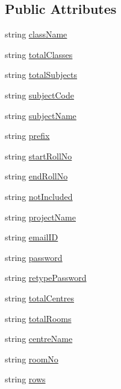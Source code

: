 \subsection*{Public Attributes}
\begin{DoxyCompactItemize}
\item 
string \hyperlink{classInputFieldName_ad8b28ebeabdabb5967542e317f549280}{class\-Name}
\item 
string \hyperlink{classInputFieldName_a5bf413dee6dcf29c1872e93f150d48c0}{total\-Classes}
\item 
string \hyperlink{classInputFieldName_ac58130077f39d82aaf447b1a67e9f70f}{total\-Subjects}
\item 
string \hyperlink{classInputFieldName_af1cc6871c33344c365e6e25ea482bd48}{subject\-Code}
\item 
string \hyperlink{classInputFieldName_a0614731b959afef6bb00f9fc957e7521}{subject\-Name}
\item 
string \hyperlink{classInputFieldName_a161d155f8faca2c5dea1bbd607b17553}{prefix}
\item 
string \hyperlink{classInputFieldName_a24baf5c915b4ee0fb8678e03adec043a}{start\-Roll\-No}
\item 
string \hyperlink{classInputFieldName_a06435f9ba5a529cbba4ee1ce9b02e5cc}{end\-Roll\-No}
\item 
string \hyperlink{classInputFieldName_a9ee6ee84737e1199bdfd9fb24c82c2c7}{not\-Included}
\item 
string \hyperlink{classInputFieldName_ab93b034743570810afe89aea88a7bbf6}{project\-Name}
\item 
string \hyperlink{classInputFieldName_a05541618feaaebe7a3f74b0bf8fa74b9}{email\-I\-D}
\item 
string \hyperlink{classInputFieldName_a318f819ef4663d7e5f40d91180093cb9}{password}
\item 
string \hyperlink{classInputFieldName_acd50095ae8540a735bcd5787b904b06c}{retype\-Password}
\item 
string \hyperlink{classInputFieldName_af88ac102ec3a4adbb9edc7c3d61919cb}{total\-Centres}
\item 
string \hyperlink{classInputFieldName_a51fe8230341d7863ffd4672f2c986beb}{total\-Rooms}
\item 
string \hyperlink{classInputFieldName_a19c67f2d38cde97f856d4ca3639f4fc7}{centre\-Name}
\item 
string \hyperlink{classInputFieldName_abb6b245e03e76aa29d7ef8733298e72f}{room\-No}
\item 
string \hyperlink{classInputFieldName_a1b5a819437f52b4bb6b0ea59f542f9a9}{rows}

\end{DoxyCompactItemize}
